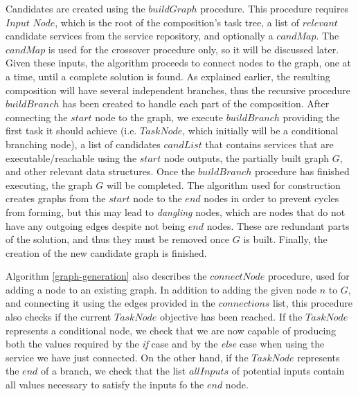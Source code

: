 Candidates are created using the $buildGraph$ procedure. This procedure requires $Input$ $Node$, which is the root of the composition's task tree, a list of $relevant$ candidate services from the service repository, and optionally a $candMap$. The $candMap$ is used for the crossover procedure only, so it will be discussed later. Given these inputs, the algorithm proceeds to connect nodes to the graph, one at a time, until a complete solution is found. As explained earlier, the resulting composition will have several independent branches, thus the recursive procedure $buildBranch$ has been created to handle each part of the composition. After connecting the $start$ node to the graph, we execute $buildBranch$ providing the first task it should achieve (i.e. $TaskNode$, which initially will be a conditional branching node), a list of candidates $candList$ that contains services that are executable/reachable using the $start$ node outputs, the partially built graph $G$, and other relevant data structures. Once the $buildBranch$ procedure has finished executing, the graph $G$ will be completed. The algorithm used for construction creates graphs from the $start$ node to the $end$ nodes in order to prevent cycles from forming, but this may lead to \textit{dangling} nodes, which are nodes that do not have any outgoing edges despite not being $end$ nodes. These are redundant parts of the solution, and thus they must be removed once $G$ is built. Finally, the creation of the new candidate graph is finished.

Algorithm \ref{graph-generation} also describes the $connectNode$ procedure, used for adding a node to an existing graph. In addition to adding the given node $n$ to $G$, and connecting it using the edges provided in the $connections$ list, this procedure also checks if the current $TaskNode$ objective has been reached. If the $TaskNode$ represents a conditional node, we check that we are now capable of producing both the  values required by the \textit{if} case and by the \textit{else} case when using the service we have just connected. On the other hand, if the $TaskNode$ represents the $end$ of a branch, we check that the list $allInputs$ of potential inputs contain all values necessary to satisfy the inputs fo the $end$ node.


